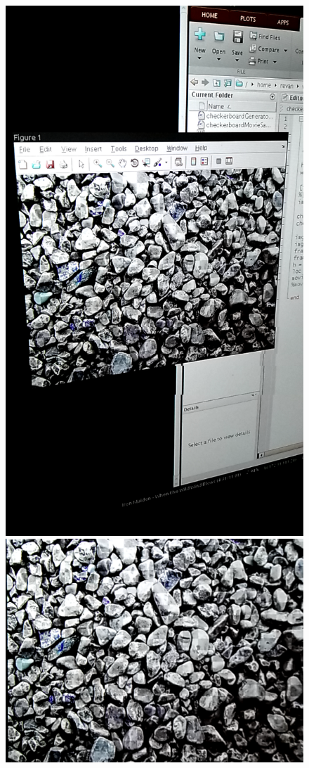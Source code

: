\documentclass[11pt, letterpaper]{article}
\begin{document}
\begin{figure}[hbtp]
\centering
\includegraphics[scale=0.10]{img/skew.png}
\includegraphics[scale=0.2]{img/skew2.png}

\end{figure}
\end{document}
